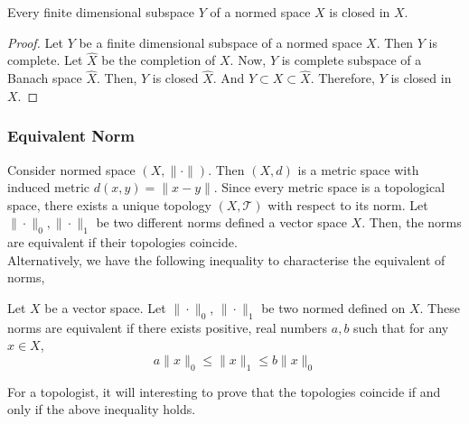 \begin{theorem}
	Every finite dimensional subspace $Y$ of a normed space $X$ is closed in $X$.
\end{theorem}
\begin{proof}
	Let $Y$ be a finite dimensional subspace of a normed space $X$.
	Then $Y$ is complete.
	Let $\hat{X}$ be the completion of $X$.
	Now, $Y$ is complete subspace of a Banach space $\hat{X}$.
	Then, $Y$ is closed $\hat{X}$.
	And $Y \subset X \subset \hat{X}$.
	Therefore, $Y$ is closed in $X$.
\end{proof}

\subsubsection{Equivalent Norm}
	\par Consider normed space $(X,\|\cdot\|)$.
	Then $(X,d)$ is a metric space with induced metric $d(x,y) = \| x-y \|$.
	Since every metric space is a topological space, there exists a unique topology $(X,\mathcal{T})$ with respect to its norm.
	Let $\|\cdot\|_0,\|\cdot\|_1$ be two different norms defined a vector space $X$.
	Then, the norms are equivalent if their topologies coincide.\\

	Alternatively, we have the following inequality to characterise the equivalent of norms,

\begin{definition}
	Let $X$ be a vector space.
	Let $\|\cdot\|_0$, $\|\cdot\|_1$ be two normed defined on $X$.
	These norms are equivalent if there exists positive, real numbers $a,b$ such that for any $x \in X$,
	\begin{equation}
		a\|x\|_0 \le \|x\|_1 \le b\|x\|_0
	\end{equation}
\end{definition}
\begin{commentary}
	For a topologist, it will interesting to prove that the topologies coincide if and only if the above inequality holds.
\end{commentary}

